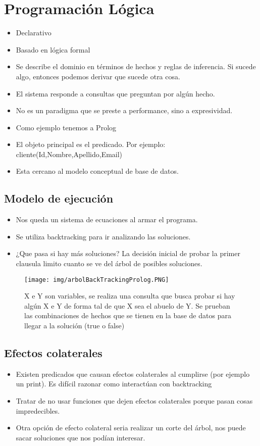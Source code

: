 \section{Programación Lógica}

\begin{itemize}
\item Declarativo
\item Basado en lógica formal
\item Se describe el dominio en términos de hechos y reglas de inferencia. Si sucede algo, entonces podemos derivar que sucede otra cosa.
\item El sistema responde a consultas que preguntan por algún hecho.
\item No es un paradigma que se preste a performance, sino a expresividad.
\item Como ejemplo tenemos a Prolog
\item El objeto principal es el predicado. Por ejemplo: cliente(Id,Nombre,Apellido,Email)
\item Esta cercano al modelo conceptual de base de datos.
\end{itemize}


\subsection*{Modelo de ejecución}

\begin{itemize}
\item Nos queda un sistema de ecuaciones al armar el programa.
\item Se utiliza backtracking para ir analizando las soluciones.
\item ¿Que pasa si hay más soluciones? La decisión inicial de probar la primer clausula limito cuanto se ve del árbol de posibles soluciones.
\end{itemize}

\begin{figure}[!htb]
    \centering
    \texttt{[image: img/arbolBackTrackingProlog.PNG]}
    \caption{X e Y son variables, se realiza una consulta que busca probar si hay algún X e Y de forma tal de que X sea el abuelo de Y. Se prueban las combinaciones de hechos que se tienen en la base de datos para llegar a la solución (true o false)}
\end{figure}


\subsection*{Efectos colaterales}
\begin{itemize}
\item Existen predicados que causan efectos colaterales al cumplirse (por ejemplo un print). Es difícil razonar como interactúan con backtracking
\item Tratar de no usar funciones que dejen efectos colaterales porque pasan cosas impredecibles.
\item Otra opción de efecto colateral seria realizar un corte del árbol, nos puede sacar soluciones que nos podían interesar.
\end{itemize}

